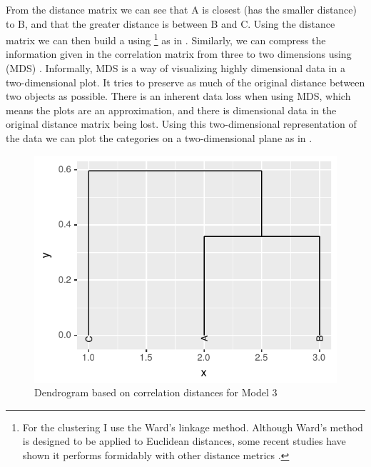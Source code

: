 From the distance matrix we can see that A is closest (has the smaller distance) to B, and that the greater distance is between B and C. Using the distance matrix we can then build a  using \footnote{For the clustering I use the Ward's linkage method. Although Ward's method \autocite{Murtagh.2014} is designed to be applied to Euclidean distances, some recent studies have shown it performs formidably with other distance metrics \autocites{Meyniel.2010, Strauss.2017}.} \autocite{Rokach.2005} as in . Similarly, we can compress the information given in the correlation matrix from three to two dimensions using  (MDS) \autocite{Borg.2005, Cysouw.2007c}. Informally, MDS is a way of visualizing highly dimensional data in a two-dimensional plot. It tries to preserve as much of the original distance between two objects as possible. There is an inherent data loss when using MDS, which means the plots are an approximation, and there is dimensional data in the original distance matrix being lost. Using this two-dimensional representation of the data we can plot the categories on a two-dimensional plane as in .

\begin{figure}%
  \centering
  \includegraphics{./figures/fake/dendro3.pdf}
  \caption{Dendrogram based on correlation distances for Model 3}\label{fig:dendro-model3}
\end{figure}

